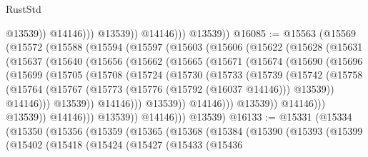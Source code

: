 \begin{lexlean}{RustStd}
\begin{coremodule}
                            @13539))
                        @14146)))
                  @13539))
              @14146)))
        @13539))
@16085 := @15563
    (@15569
      (@15572
        (@15588
          (@15594
            (@15597
              (@15603
                (@15606
                  (@15622
                    (@15628
                      (@15631
                        (@15637
                          (@15640
                            (@15656
                              (@15662
                                (@15665
                                  (@15671
                                    (@15674
                                      (@15690
                                        (@15696
                                          (@15699
                                            (@15705
                                              (@15708
                                                (@15724
                                                  (@15730
                                                    (@15733
                                                      (@15739
                                                        (@15742
                                                          (@15758
                                                            (@15764
                                                              (@15767
                                                                (@15773
                                                                  (@15776 (@15792 (@16037 @14146)))
                                                                  @13539))
                                                              @14146)))
                                                        @13539))
                                                    @14146)))
                                              @13539))
                                          @14146)))
                                    @13539))
                                @14146)))
                          @13539))
                      @14146)))
                @13539))
            @14146)))
      @13539)
@16133 := @15331
    (@15334
      (@15350
        (@15356
          (@15359
            (@15365
              (@15368
                (@15384
                  (@15390
                    (@15393
                      (@15399
                        (@15402
                          (@15418
                            (@15424
                              (@15427
                                (@15433
                                  (@15436

\end{coremodule}
\end{lexlean}
